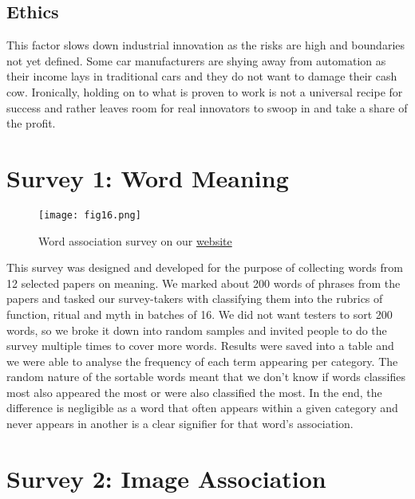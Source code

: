 \documentclass[12pt, usenames, dvipsnames]{report}
\begin{document}
\begin{flushleft}
\subsection{Ethics}

This factor slows down industrial innovation as the risks are high and boundaries not yet defined.
Some car manufacturers are shying away from automation as their income lays in traditional cars and they do not want to damage their cash cow.
Ironically, holding on to what is proven to work is not a universal recipe for success and rather leaves room for real innovators to swoop in and take a share of the profit.


\section{Survey 1: Word Meaning}

\vspace*{1.2em}
\begin{figure}[!htbp]
  \hspace*{-3.666em}
  \texttt{[image: fig16.png]}
  \caption{Word association survey on our \href{https://meaning.pub}{website}}
  \label{fig:figure16}
\end{figure}
\vspace*{1.2em}

This survey was designed and developed for the purpose of collecting words from 12 selected papers on meaning. 
We marked about 200 words of phrases from the papers and tasked our survey-takers with classifying them into the rubrics of function, ritual and myth in batches of 16.
We did not want testers to sort 200 words, so we broke it down into random samples and invited people to do the survey multiple times to cover more words.
Results were saved into a table and we were able to analyse the frequency of each term appearing per category.
The random nature of the sortable words meant that we don't know if words classifies most also appeared the most or were also classified the most.
In the end, the difference is negligible as a word that often appears within a given category and never appears in another is a clear signifier for that word's association.


\section{Survey 2: Image Association}


\end{flushleft}
\end{document}

